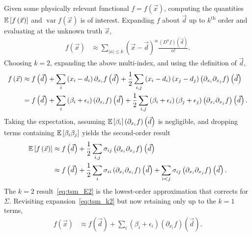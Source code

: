 Given some physically relevant functional $f = f\left(\vec{x}\right)$, computing
the quantities $\operatorname{\mathbb{E}}\left[f\left(\vec{x}\right)\right]$ and $\operatorname{var}
f\left(\vec{x}\right) $ is of interest.  Expanding $f$ about $\vec{d}$ up to
$k^\mathrm{th}$ order and evaluating at the unknown truth $\vec{x}$,
\begin{align}
  f(\vec{x})
&\approx
  \sum_{|\alpha| \le k} \left( \vec{x} - \vec{d} \right)^\alpha
  \frac{\left(D^\alpha f\right)\left(\vec{d}\right)}{\alpha!}.
\end{align}
Choosing $k=2$, expanding the above multi-index, and using the definition of $\vec{d}$,
\begin{align}
  f\left(\vec{x}\right)
&\approx
    f\left(\vec{d}\right)
  + \sum_i \left(x_i-d_i\right) \partial_{x_i} f\left(\vec{d}\right)
  + \frac{1}{2} \sum_{i,j}
                \left(x_i-d_i\right)\left(x_j-d_j\right)
                \left(\partial_{x_i} \partial_{x_j} f\right)\left(\vec{d}\right)
\notag\\
&=
    f\left(\vec{d}\right)
  + \sum_i \left(\beta_i+\epsilon_i\right)
           \left(\partial_{x_i} f\right)\left(\vec{d}\right)
  + \frac{1}{2} \sum_{i,j}
                \left(\beta_i+\epsilon_i\right)
                \left(\beta_j+\epsilon_j\right)
                \left(\partial_{x_i} \partial_{x_j} f\right)\left(\vec{d}\right)
\label{eq:tsm_k2}.
\end{align}
Taking the expectation, assuming $\operatorname{\mathbb{E}}\left[\beta_i\right]\left(\partial_{x_i}
f\right)\left(\vec{d}\right)$ is negligible, and dropping
terms containing $\operatorname{\mathbb{E}}\left[\beta_i \beta_j\right]$ yields the second-order result
\begin{align}
  \operatorname{\mathbb{E}}\left[f\left(\vec{x}\right)\right]
&\approx
    f\left(\vec{d}\right)
  + \frac{1}{2} \sum_{i,j}
                \sigma_{ij}
                \left(\partial_{x_i} \partial_{x_j} f\right)\left(\vec{d}\right)
\notag\\
&\approx
    f\left(\vec{d}\right)
  + \frac{1}{2} \sum_{i}
                \sigma_{ii}
                \left(\partial_{x_i} \partial_{x_i} f\right)\left(\vec{d}\right)
  +             \sum_{i<j}
                \sigma_{ij}
                \left(\partial_{x_i} \partial_{x_j} f\right)\left(\vec{d}\right)
\label{eq:tsm_E2}.
\end{align}
The $k=2$ result~\eqref{eq:tsm_E2} is the lowest-order approximation that
corrects for $\Sigma$.  Revisiting expansion~\eqref{eq:tsm_k2} but now
retaining only up to the $k=1$ terms,
\begin{align}
  f\left(\vec{x}\right)
&\approx
    f\left(\vec{d}\right)
  + \sum_i \left(\beta_i+\epsilon_i\right)
           \left(\partial_{x_i} f\right)\left(\vec{d}\right)
\label{eq:tsm_k1}.
\end{align}

